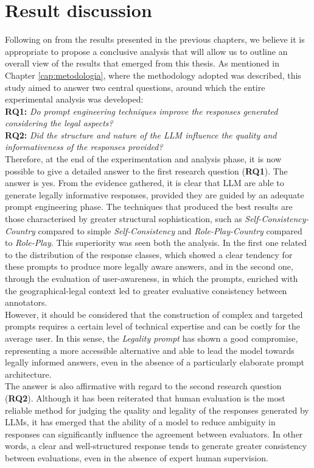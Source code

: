 \section{Result discussion}
Following on from the results presented in the previous chapters, we believe it is appropriate to propose a conclusive analysis that will allow us to outline an overall view of the results that emerged from this thesis.
As mentioned in Chapter \ref{cap:metodologia}, where the methodology adopted was described, this study aimed to answer two central questions, around which the entire experimental analysis was developed:\\
\textbf{RQ1: }\textit{Do prompt engineering techniques improve the responses generated considering the legal aspects?}\\
\textbf{RQ2: }\textit{Did the structure and nature of the LLM influence the quality and informativeness of the responses provided?}\\
Therefore, at the end of the experimentation and analysis phase, it is now possible to give a detailed answer to the first research question (\textbf{RQ1}). The answer is yes.
From the evidence gathered, it is clear that LLM are able to generate legally informative responses, provided they are guided by an adequate prompt engineering phase.
The techniques that produced the best results are those characterised by greater structural sophistication, such as \textit{Self-Consistency-Country} compared to simple \textit{Self-Consistency} and \textit{Role-Play-Country} compared to \textit{Role-Play}.
This superiority was seen both the analysis. In the first one related to the distribution of the response classes, which showed a clear tendency for these prompts to produce more legally aware answers, and in the second one, through the evaluation of user-awareness, in which the prompts, enriched with the geographical-legal context led to greater evaluative consistency between annotators.\\
However, it should be considered that the construction of complex and targeted prompts requires a certain level of technical expertise and can be costly for the average user. In this sense, the \textit{Legality prompt} has shown a good compromise, representing a more accessible alternative and able to lead the model towards legally informed answers, even in the absence of a particularly elaborate prompt architecture.
\\
The answer is also affirmative with regard to the second research question (\textbf{RQ2}).
Although it has been reiterated that human evaluation is the most reliable method for judging the quality and legality of the responses generated by LLMs, it has emerged that the ability of a model to reduce ambiguity in responses can significantly influence the agreement between evaluators. In other words, a clear and well-structured response tends to generate greater consistency between evaluations, even in the absence of expert human supervision.
